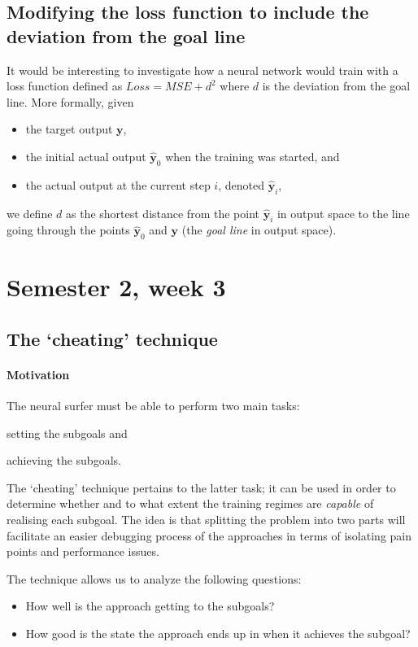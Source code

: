 \documentclass{article}
\renewcommand\vec{\mathbf}
\begin{document}
\subsection{Modifying the loss function to include the deviation from the goal line}
It would be interesting to investigate how a neural network would train with a loss function defined as
$Loss = MSE + d^2$ where $d$ is the deviation from the goal line. More formally, given 
\begin{itemize}
    \item the target output $\vec{y}$,
    \item the initial actual output $\vec{\hat{y}}_0$ when the training was started, and
    \item the actual output at the current step $i$, denoted $\vec{\hat{y}}_i$,
\end{itemize}
we define $d$ as the shortest distance from the point $\vec{\hat{y}}_i$ in output space to the line going through the points $\vec{\hat{y}}_0$ and $\vec{y}$ (the \textit{goal line} in output space).

\section{Semester 2, week 3}

\subsection{The `cheating' technique}
\paragraph{Motivation}
The neural surfer must be able to perform two main tasks: 
\begin{enumerate*}[label=(\roman*)]
    \item setting the subgoals and
    \item achieving the subgoals.
\end{enumerate*}
The `cheating' technique pertains to the latter task; it can be used in order to determine whether and to what extent the training regimes are \textit{capable} of realising each subgoal.
The idea is that splitting the problem into two parts will facilitate an easier debugging process of the approaches in terms of isolating pain points and performance issues.

The technique allows us to analyze the following questions:
\begin{itemize}
    \item How well is the approach getting to the subgoals?
    \item How good is the state the approach ends up in when it achieves the subgoal?
\end{itemize}
\end{document}
